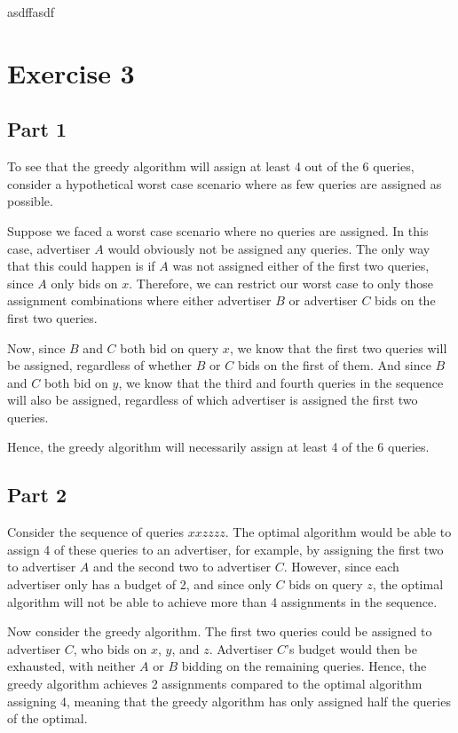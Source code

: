\documentclass[12t]{article}
\begin{document}
	asdffasdf

	
	\section*{Exercise 3}
	
	\subsection*{Part 1}	
	
	To see that the greedy algorithm will assign at least 4 out of the 6 queries, consider a hypothetical worst case scenario where as few queries are assigned as possible. 
	
	Suppose we faced a worst case scenario where no queries are assigned. In this case, advertiser $A$ would obviously not be assigned any queries. The only way that this could happen is if $A$ was not assigned either of the first two queries, since $A$ only bids on $x$. Therefore, we can restrict our worst case to only those assignment combinations where either advertiser $B$ or advertiser $C$ bids on the first two queries. 
	
	Now, since $B$ and $C$ both bid on query $x$, we know that the first two queries will be assigned, regardless of whether $B$ or $C$ bids on the first of them. And since $B$ and $C$ both bid on $y$, we know that the third and fourth queries in the sequence will also be assigned, regardless of which advertiser is assigned the first two queries. 
	
	Hence, the greedy algorithm will necessarily assign at least 4 of the 6 queries. 

	\subsection*{Part 2}
	
	Consider the sequence of queries $xxzzzz$. The optimal algorithm would be able to assign 4 of these queries to an advertiser, for example, by assigning the first two to advertiser $A$ and the second two to advertiser $C$. However, since each advertiser only has a budget of 2, and since only $C$ bids on query $z$, the optimal algorithm will not be able to achieve more than 4 assignments in the sequence. 
	
	Now consider the greedy algorithm. The first two queries could be assigned to advertiser $C$, who bids on $x$, $y$, and $z$. Advertiser $C$'s budget would then be exhausted, with neither $A$ or $B$ bidding on the remaining queries. Hence, the greedy algorithm achieves 2 assignments compared to the optimal algorithm assigning 4, meaning that the greedy algorithm has only assigned half the queries of the optimal.


\end{document}
